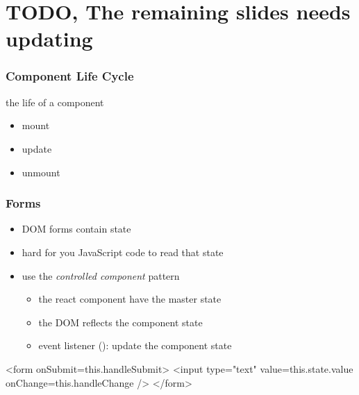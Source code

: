\section{TODO, The remaining slides needs updating}

\begin{frame}[fragile] \frametitle{Component Life Cycle}
the life of a component
\begin{itemize}
  \item mount
  \item update
  \item unmount
\end{itemize}
\end{frame}

\begin{frame}[fragile] \frametitle{Forms}
\begin{itemize}
  \item DOM forms contain state
  \item hard for you JavaScript code to read that state
  \item use the \emph{controlled component} pattern
  \begin{itemize}
    \item the react component have the master state
    \item the DOM reflects the component state
    \item event listener (): update the component state
  \end{itemize}
\end{itemize}
\vspace{5mm}
\begin{CodeBox}{}
<form onSubmit={this.handleSubmit}>
  <input type="text" 
        value={this.state.value}
        onChange={this.handleChange}
  />
</form>
\end{CodeBox}
\end{frame}

